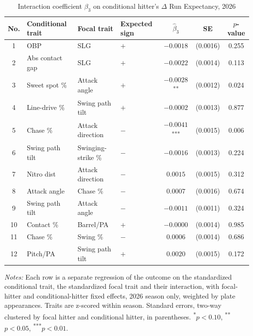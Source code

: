 \begin{table}[htbp]
\centering
\small
\caption{Interaction coefficient $\beta_3$ on conditional hitter's $\Delta$ Run Expectancy, 2026}
\label{tab:table1_cond_2026}
\begin{tabular}{clllccc}
\toprule
No. & Conditional trait & Focal trait & Expected sign & $\hat\beta_3$ & SE & $p$-value \\
\midrule
1 & OBP & SLG & $+$ & $-0.0018$ & (0.0016) & 0.255 \\
2 & Abs contact gap & SLG & $+$ & $-0.0022$ & (0.0014) & 0.113 \\
3 & Sweet spot \% & Attack angle & $+$ & $-0.0028$\textsuperscript{**} & (0.0012) & 0.024 \\
4 & Line-drive \% & Swing path tilt & $+$ & $-0.0002$ & (0.0013) & 0.877 \\
5 & Chase \% & Attack direction & $-$ & $-0.0041$\textsuperscript{***} & (0.0015) & 0.006 \\
6 & Swing path tilt & Swinging-strike \% & $-$ & $-0.0016$ & (0.0013) & 0.224 \\
7 & Nitro dist & Attack direction & $-$ & $0.0015$ & (0.0015) & 0.312 \\
8 & Attack angle & Chase \% & $-$ & $0.0007$ & (0.0016) & 0.674 \\
9 & Swing path tilt & Attack angle & $-$ & $-0.0011$ & (0.0011) & 0.324 \\
10 & Contact \% & Barrel/PA & $+$ & $-0.0000$ & (0.0014) & 0.985 \\
11 & Chase \% & Swing \% & $-$ & $0.0006$ & (0.0014) & 0.686 \\
12 & Pitch/PA & Swing path tilt & $+$ & $0.0020$ & (0.0015) & 0.172 \\
\bottomrule
\end{tabular}
\par\smallskip\parbox{0.95\textwidth}{\footnotesize \textit{Notes:} Each row is a separate regression of the outcome on the standardized conditional trait, the standardized focal trait and their interaction, with focal-hitter and conditional-hitter fixed effects, 2026 season only, weighted by plate appearances. Traits are z-scored within season. Standard errors, two-way clustered by focal hitter and conditional hitter, in parentheses. \textsuperscript{*}$p<0.10$, \textsuperscript{**}$p<0.05$, \textsuperscript{***}$p<0.01$.}
\end{table}
